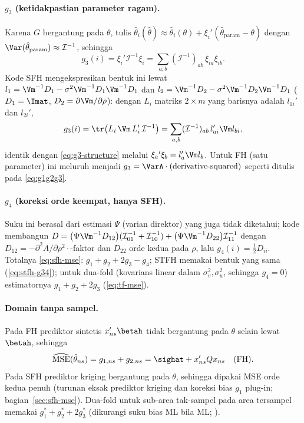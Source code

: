 \paragraph{$g_3$ (ketidakpastian parameter ragam).} Karena $G$ bergantung
pada $\theta$, tulis $\hat\theta_i(\hat\theta)\approx\hat\theta_i(\theta)
+\xi_i'(\hat\theta_{\text{param}}-\theta)$ dengan
$\Var(\hat\theta_{\text{param}})\approx\mathcal I^{-1}$, sehingga
\begin{equation}
  g_3(i)=\xi_i'\mathcal I^{-1}\xi_i
  =\sum_{a,b}(\mathcal I^{-1})_{ab}\,\xi_{ia}\xi_{ib}.
  \label{eq:g3-structure}
\end{equation}
Kode SFH mengekspresikan bentuk ini lewat $l_1=\Vm^{-1}D_1-\sigma^2
\Vm^{-1}D_1\Vm^{-1}D_1$ dan $l_2=\Vm^{-1}D_2-\sigma^2\Vm^{-1}D_2
\Vm^{-1}D_1$ ($D_1=\Imat$, $D_2=\partial\Vm/\partial\rho$): dengan
$L_i$ matriks $2\times m$ yang barisnya adalah $l_{1i}'$ dan $l_{2i}'$,
\begin{equation}
  g_3(i)=\tr\bigl(L_i\,\Vm\,L_i'\,\mathcal I^{-1}\bigr)
  =\sum_{a,b}(\mathcal I^{-1})_{ab}\,l_{ai}'\Vm l_{bi},
  \label{eq:g3-sfh}
\end{equation}
identik dengan \eqref{eq:g3-structure} melalui
$\xi_{a}{}'\xi_{b}=l_{a}'\Vm l_{b}$. Untuk FH (satu parameter) ini
meluruh menjadi $g_3=\VarA\cdot(\text{derivative-squared})$ seperti
ditulis pada \eqref{eq:g1g2g3}.

\paragraph{$g_4$ (koreksi orde keempat, hanya SFH).} Suku ini berasal dari
estimasi $\Psi$ (varian direktor) yang juga tidak diketahui; kode
membangun $D=\bigl(\Psi\Vm^{-1}D_{12}\bigr)(\mathcal I^{-1}_{01}
+\mathcal I^{-1}_{10})+\bigl(\Psi\Vm^{-1}D_{22}\bigr)\mathcal I^{-1}_{11}$
dengan $D_{12}=-\partial^2A/\partial\rho^2\cdot$-faktor dan
$D_{22}$ orde kedua pada $\rho$, lalu $g_4(i)=\tfrac12 D_{ii}$. Totalnya
\eqref{eq:sfh-mse}: $g_1+g_2+2g_3-g_4$; STFH memakai bentuk yang sama
(\eqref{eq:stfh-g34}); untuk dua-fold (kovarians linear dalam
$\sigma_v^2,\sigma_u^2$, sehingga $g_4=0$) estimatornya $g_1+g_2+2g_3$
(\eqref{eq:tf-mse}).

\paragraph{Domain tanpa sampel.} Pada FH prediktor sintetis $x_{ns}'\betah$
tidak bergantung pada $\theta$ selain lewat $\betah$, sehingga
\begin{equation}
  \widehat{\mathrm{MSE}}(\hat\theta_{ns})=g_{1,ns}+g_{2,ns}=\sighat+x_{ns}'Qx_{ns}
  \quad\text{(FH)}.
  \label{eq:g-unsampled}
\end{equation}
Pada SFH prediktor kriging bergantung pada $\theta$, sehingga dipakai MSE orde
kedua penuh (turunan eksak prediktor kriging dan koreksi bias $g_1$ plug-in;
bagian~\ref{sec:sfh-mse}). Dua-fold untuk sub-area tak-sampel pada area
tersampel memakai $g_1^\ast+g_2^\ast+2g_3^\ast$ (dikurangi suku bias ML bila
ML; ).

